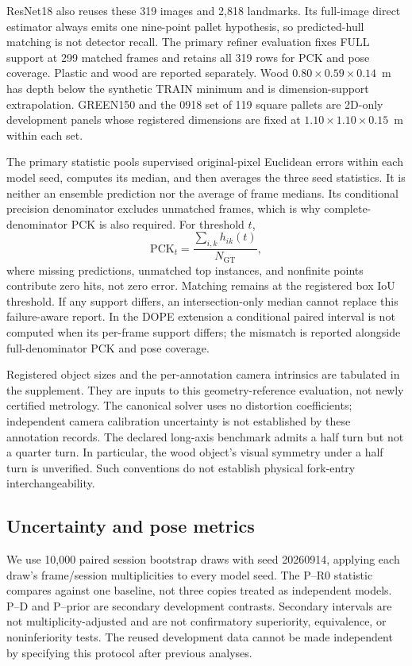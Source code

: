 \documentclass[journal]{IEEEtran}
\begin{document}
ResNet18 also reuses these 319 images and 2,818 landmarks. Its full-image direct estimator always emits one nine-point pallet hypothesis, so predicted-hull matching is not detector recall. The primary refiner evaluation fixes FULL support at 299 matched frames and retains all 319 rows for PCK and pose coverage. Plastic and wood are reported separately. Wood $0.80\times0.59\times0.14$~m has depth below the synthetic TRAIN minimum and is dimension-support extrapolation. GREEN150 and the 0918 set of 119 square pallets are 2D-only development panels whose registered dimensions are fixed at $1.10\times1.10\times0.15$~m within each set.

The primary statistic pools supervised original-pixel Euclidean errors within each model seed, computes its median, and then averages the three seed statistics. It is neither an ensemble prediction nor the average of frame medians. Its conditional precision denominator excludes unmatched frames, which is why complete-denominator PCK is also required. For threshold $t$,
\begin{equation}
\mathrm{PCK}_{t}=\frac{\sum_{i,k}h_{ik}(t)}{N_{\mathrm{GT}}},
\end{equation}
where missing predictions, unmatched top instances, and nonfinite points contribute zero hits, not zero error. Matching remains at the registered box IoU threshold. If any support differs, an intersection-only median cannot replace this failure-aware report. In the DOPE extension a conditional paired interval is not computed when its per-frame support differs; the mismatch is reported alongside full-denominator PCK and pose coverage.

Registered object sizes and the per-annotation camera intrinsics are tabulated in the supplement. They are inputs to this geometry-reference evaluation, not newly certified metrology. The canonical solver uses no distortion coefficients; independent camera calibration uncertainty is not established by these annotation records. The declared long-axis benchmark admits a half turn but not a quarter turn. In particular, the wood object's visual symmetry under a half turn is unverified. Such conventions do not establish physical fork-entry interchangeability.

\subsection{Uncertainty and pose metrics}
We use 10,000 paired session bootstrap draws with seed 20260914, applying each draw's frame/session multiplicities to every model seed. The P--R0 statistic compares against one baseline, not three copies treated as independent models. P--D and P--prior are secondary development contrasts. Secondary intervals are not multiplicity-adjusted and are not confirmatory superiority, equivalence, or noninferiority tests. The reused development data cannot be made independent by specifying this protocol after previous analyses.
\end{document}

